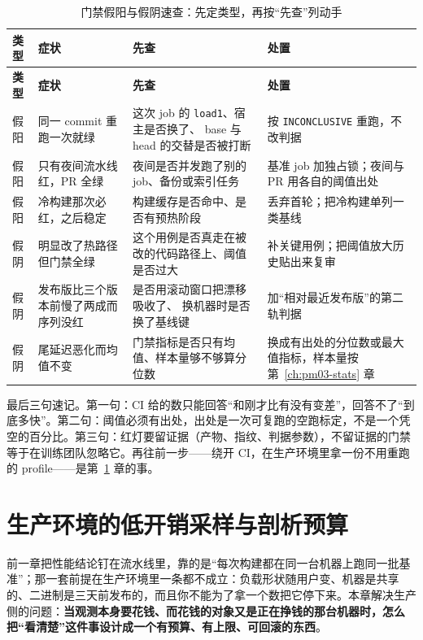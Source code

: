 \documentclass[12pt,a4paper,fontset=fandol]{ctexbook}
\newcommand{\Tp}[1]{\texttt{#1}}
\begin{document}
\begin{longtable}{|>{\raggedright\arraybackslash}p{}|>{\raggedright\arraybackslash}p{}|>{\raggedright\arraybackslash}p{}|>{\raggedright\arraybackslash}p{}|}
\caption{门禁假阳与假阴速查：先定类型，再按``先查''列动手}
\label{tab:pm13-trouble}\\
\hline
\textbf{类型} & \textbf{症状} & \textbf{先查} & \textbf{处置}\\
\hline
\endfirsthead
\hline
\textbf{类型} & \textbf{症状} & \textbf{先查} & \textbf{处置}\\
\hline
\endhead
假阳 & 同一 commit 重跑一次就绿 & 这次 job 的 \Tp{load1}、宿主是否换了、
base 与 head 的交替是否被打断 & 按 \Tp{INCONCLUSIVE} 重跑，不改判据\\
\hline
假阳 & 只有夜间流水线红，PR 全绿 & 夜间是否并发跑了别的 job、备份或索引任务 &
基准 job 加独占锁；夜间与 PR 用各自的阈值出处\\
\hline
假阳 & 冷构建那次必红，之后稳定 & 构建缓存是否命中、是否有预热阶段 &
丢弃首轮；把冷构建单列一类基线\\
\hline
假阴 & 明显改了热路径但门禁全绿 & 这个用例是否真走在被改的代码路径上、阈值是否过大 &
补关键用例；把阈值放大历史贴出来复审\\
\hline
假阴 & 发布版比三个版本前慢了两成而序列没红 & 是否用滚动窗口把漂移吸收了、
换机器时是否换了基线键 & 加``相对最近发布版''的第二轨判据\\
\hline
假阴 & 尾延迟恶化而均值不变 & 门禁指标是否只有均值、样本量够不够算分位数 &
换成有出处的分位数或最大值指标，样本量按 第~\ref{ch:pm03-stats} 章\\
\hline
\end{longtable}

最后三句速记。第一句：CI 给的数只能回答``和刚才比有没有变差''，回答不了``到底多快''。第二句：阈值必须有出处，出处是一次可复跑的空跑标定，不是一个凭空的百分比。第三句：红灯要留证据（产物、指纹、判据参数），不留证据的门禁等于在训练团队忽略它。再往前一步——绕开 CI，在生产环境里拿一份不用重跑的 profile——是第~\ref{ch:pm14-production} 章的事。
\chapter{生产环境的低开销采样与剖析预算}
\label{ch:pm14-production}

前一章把性能结论钉在流水线里，靠的是``每次构建都在同一台机器上跑同一批基准''；那一套前提在生产环境里一条都不成立：负载形状随用户变、机器是共享的、二进制是三天前发布的，而且你不能为了拿一个数把它停下来。本章解决生产侧的问题：\textbf{当观测本身要花钱、而花钱的对象又是正在挣钱的那台机器时，怎么把``看清楚''这件事设计成一个有预算、有上限、可回滚的东西}。
\end{document}
